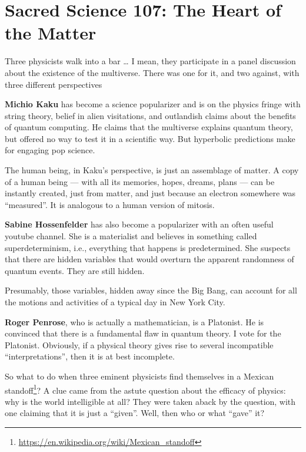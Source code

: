 \section{Sacred Science 107: The Heart of the Matter}

Three physicists walk into a bar … I mean, they participate in a panel discussion about the existence of the multiverse. There was one for it, and two against, with three different perspectives

\textbf{Michio Kaku} has become a science popularizer and is on the physics fringe with string theory, belief in alien visitations, and outlandish claims about the benefits of quantum computing. He claims that the multiverse explains quantum theory, but offered no way to test it in a scientific way. But hyperbolic predictions make for engaging pop science.

The human being, in Kaku's perspective, is just an assemblage of matter. A copy of a human being — with all its memories, hopes, dreams, plans — can be instantly created, just from matter, and just because an electron somewhere was “measured”. It is analogous to a human version of mitosis.

\textbf{Sabine Hossenfelder} has also become a popularizer with an often useful youtube channel. She is a materialist and believes in something called superdeterminism, i.e., everything that happens is predetermined. She suspects that there are hidden variables that would overturn the apparent randomness of quantum events. They are still hidden.

Presumably, those variables, hidden away since the Big Bang, can account for all the motions and activities of a typical day in New York City.

\textbf{Roger Penrose}, who is actually a mathematician, is a Platonist. He is convinced that there is a fundamental flaw in quantum theory. I vote for the Platonist. Obviously, if a physical theory gives rise to several incompatible “interpretations”, then it is at best incomplete.

So what to do when three eminent physicists find themselves in a Mexican standoff\footnote{\url{https://en.wikipedia.org/wiki/Mexican_standoff}}? A clue came from the astute question about the efficacy of physics: why is the world intelligible at all? They were taken aback by the question, with one claiming that it is just a “given”. Well, then who or what “gave” it?

